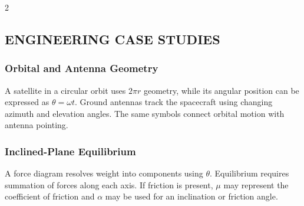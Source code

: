 \begin{multicols}{2}
  \subsection*{\centering\uppercase{Engineering Case Studies}}
  \subsubsection*{Orbital and Antenna Geometry}
  A satellite in a circular orbit uses $2\pi r$ geometry, while its angular position can be expressed as $\theta=\omega t$. Ground antennas track the spacecraft using changing azimuth and elevation angles. The same symbols connect orbital motion with antenna pointing.

  \subsubsection*{Inclined-Plane Equilibrium}
  A force diagram resolves weight into components using $\theta$. Equilibrium requires summation of forces along each axis.   If friction is present, $\mu$ may represent the coefficient of friction and $\alpha$ may be used for an inclination or friction angle.
\end{multicols}

\vspace{-0.18em}

